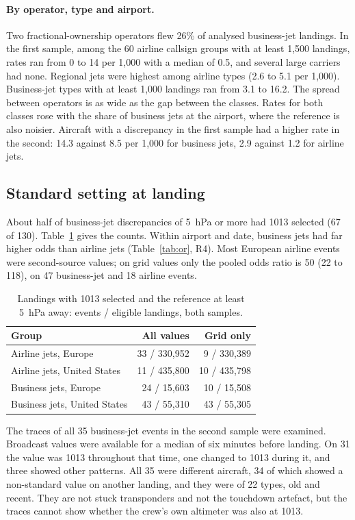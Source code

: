 \documentclass[11pt]{article}
\begin{document}
\paragraph{By operator, type and airport.} Two fractional-ownership operators flew 26\% of analysed business-jet landings. In the first sample, among the 60 airline callsign groups with at least 1{,}500 landings, rates ran from 0 to 14 per 1{,}000 with a median of 0.5, and several large carriers had none. Regional jets were highest among airline types (2.6 to 5.1 per 1{,}000). Business-jet types with at least 1{,}000 landings ran from 3.1 to 16.2. The spread between operators is as wide as the gap between the classes. Rates for both classes rose with the share of business jets at the airport, where the reference is also noisier. Aircraft with a discrepancy in the first sample had a higher rate in the second: 14.3 against 8.5 per 1{,}000 for business jets, 2.9 against 1.2 for airline jets.

\subsection{Standard setting at landing}

About half of business-jet discrepancies of 5~hPa or more had 1013 selected (67 of 130). Table~\ref{tab:std} gives the counts. Within airport and date, business jets had far higher odds than airline jets (Table~\ref{tab:or}, R4). Most European airline events were second-source values; on grid values only the pooled odds ratio is 50 (22 to 118), on 47 business-jet and 18 airline events.

\begin{table}[!ht]
\centering
\caption{Landings with 1013 selected and the reference at least 5~hPa away: events / eligible landings, both samples.}\label{tab:std}
\begin{tabular}{lrr}
\toprule
Group & All values & Grid only \\
\midrule
Airline jets, Europe & 33 / 330{,}952 & 9 / 330{,}389 \\
Airline jets, United States & 11 / 435{,}800 & 10 / 435{,}798 \\
Business jets, Europe & 24 / 15{,}603 & 10 / 15{,}508 \\
Business jets, United States & 43 / 55{,}310 & 43 / 55{,}305 \\
\bottomrule
\end{tabular}
\end{table}

The traces of all 35 business-jet events in the second sample were examined. Broadcast values were available for a median of six minutes before landing. On 31 the value was 1013 throughout that time, one changed to 1013 during it, and three showed other patterns. All 35 were different aircraft, 34 of which showed a non-standard value on another landing, and they were of 22 types, old and recent. They are not stuck transponders and not the touchdown artefact, but the traces cannot show whether the crew's own altimeter was also at 1013.
\end{document}
